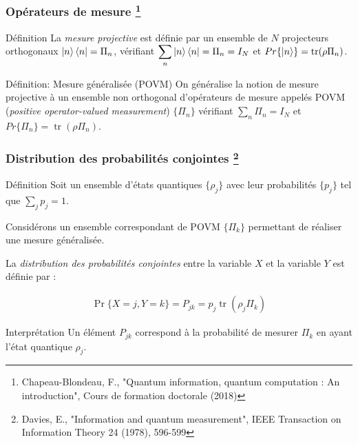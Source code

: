 \documentclass{beamer}
\DeclareMathOperator{\tr}{tr}
\begin{document}
\begin{frame}
    \frametitle{Opérateurs de mesure \footnote{Chapeau-Blondeau, F., "Quantum information, quantum computation : An introduction", Cours de formation doctorale (2018)}}

    \begin{block}{Définition}
        La \textit{mesure projective} est définie par un ensemble de $N$ projecteurs orthogonaux $\ket{n}\bra{n} = \Pi_n$, vérifiant $\displaystyle \sum_n\ket{n}\bra{n} = \displaystyle \Pi_n = I_N$ et $Pr\{\ket{n}\} = \tr(\rho \Pi_n)$.
    \end{block}

    \begin{block}{Définition: Mesure généralisée (POVM)}
        On généralise la notion de mesure projective à un ensemble non orthogonal d'opérateurs de mesure appelés POVM (\textit{positive operator-valued measurement}) $\{\Pi_n\}$ vérifiant $\displaystyle \sum_n \Pi_n = I_N$ et $Pr\{\Pi_n\} = \tr(\rho \Pi_n)$.
    \end{block}

\end{frame}

\begin{frame}
    \frametitle{Distribution des probabilités conjointes \footnote{Davies, E., "Information and quantum measurement", IEEE Transaction on Information Theory 24 (1978), 596-599}}
    \small
    \begin{block}{Définition}
        Soit un ensemble d'états quantiques $\{\rho_j\}$ avec leur probabilités $\{p_j\}$ tel que $\displaystyle \sum_j p_j = 1$.

        Considérons un ensemble correspondant de POVM $\{\Pi_k\}$ permettant de réaliser une mesure généralisée.

        La \textit{distribution des probabilités conjointes} entre la variable $X$ et la variable $Y$ est définie par :

        \begin{align}
            \Pr\{X = j, Y = k\} = P_{jk} = p_j \tr(\rho_j \Pi_k)
        \end{align}
    \end{block}

    \begin{block}{Interprétation}
        Un élément $P_{jk}$ correspond à la probabilité de mesurer $\Pi_k$ en ayant l'état quantique $\rho_j$.
    \end{block}
\end{frame}
\end{document}
